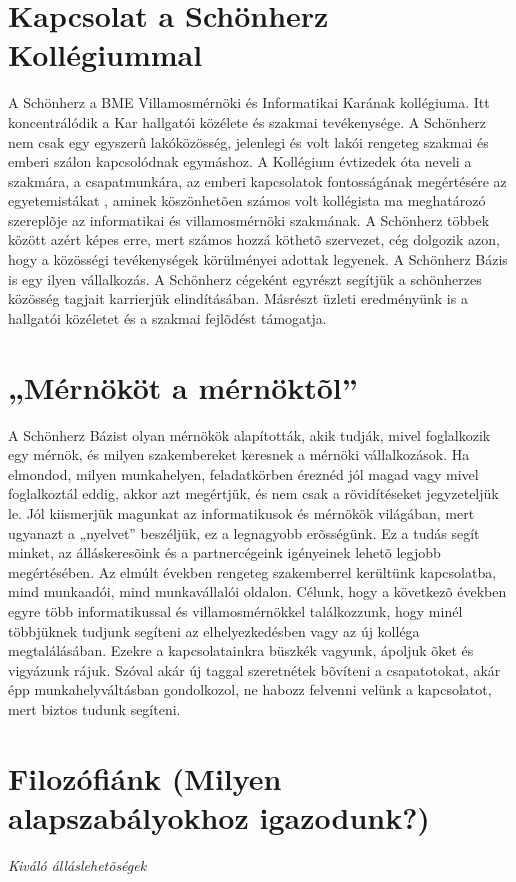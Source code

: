 \documentclass[a4paper]{book}
\begin{document}
\section{Kapcsolat a Schönherz Kollégiummal}
A Schönherz a BME Villamosmérnöki és Informatikai Karának kollégiuma. Itt koncentrálódik a Kar hallgatói közélete és szakmai tevékenysége. A Schönherz nem csak egy egyszerû lakóközösség, jelenlegi és volt lakói rengeteg szakmai és emberi szálon kapcsolódnak egymáshoz. A Kollégium évtizedek óta neveli a szak\-mára, a csapatmunkára, az emberi kapcsolatok fontosságának megértésére az egyetemistákat , aminek köszönhetõen számos volt kollégista ma meghatározó szereplõje az informatikai és villamosmérnöki szakmának. A Schönherz többek között azért képes erre, mert számos hozzá köthetõ szervezet, cég dolgozik azon, hogy a közösségi tevékenységek körülményei adottak legyenek. A Schönherz Bázis is egy ilyen vállalkozás. A Schönherz cégeként egyrészt segítjük a schönherzes közösség tagjait karrierjük elindításában. Másrészt üzleti eredményünk is a hallgatói közéletet és a szakmai fejlõdést támogatja.
\section{„Mérnököt a mérnöktõl”}
A Schönherz Bázist olyan mérnökök alapították, akik tudják, mivel foglalkozik egy mérnök, és milyen szakembereket keresnek a mérnöki vállalkozások. Ha elmondod, milyen munkahelyen, feladatkörben éreznéd jól magad vagy mivel foglalkoztál eddig, akkor azt megértjük, és nem csak a rövidítéseket jegyzeteljük le. Jól kiismerjük magunkat az informatikusok és mérnökök világában, mert ugyanazt a „nyelvet” beszéljük, ez a legnagyobb erõsségünk. Ez a tudás segít minket, az álláskeresõink és a partnercégeink igényeinek lehetõ legjobb megértésében. Az elmúlt években rengeteg szakemberrel kerültünk kapcsolatba, mind munkaadói, mind munkavállalói oldalon. Célunk, hogy a következõ években egyre több informatikussal és villamosmérnökkel találkozzunk, hogy minél többjüknek tudjunk segíteni az elhelyezkedésben vagy az új kolléga megtalálásában. Ezekre a kapcsolatainkra büszkék vagyunk, ápoljuk õket és vigyázunk rájuk. Szóval akár új taggal szeretnétek bõvíteni a csapatotokat, akár épp munkahelyváltásban gondolkozol, ne habozz felvenni velünk a kapcsolatot, mert biztos tudunk segíteni.
\section{Filozófiánk (Milyen alapszabályokhoz igazodunk?)}
\textit{Kiváló álláslehetõségek}
\end{document}

